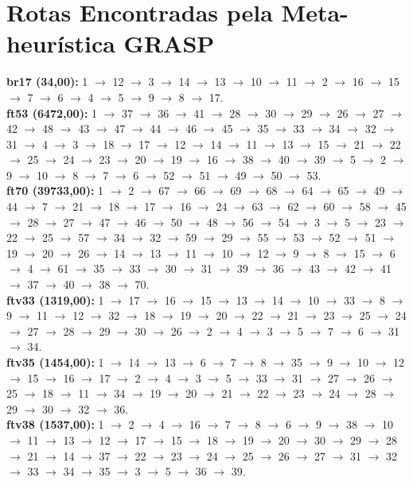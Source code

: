 \documentclass[10pt,a4paper]{article}
\begin{document}
\section{Rotas Encontradas pela Meta-heurística GRASP}
\small
\noindent \textbf{br17 (34,00):} 1 $\to$ 12 $\to$ 3 $\to$ 14 $\to$ 13 $\to$ 10 $\to$ 11 $\to$ 2 $\to$ 16 $\to$ 15 $\to$ 7 $\to$ 6 $\to$ 4 $\to$ 5 $\to$ 9 $\to$ 8 $\to$ 17. \\
\textbf{ft53 (6472,00):} 1 $\to$ 37 $\to$ 36 $\to$ 41 $\to$ 28 $\to$ 30 $\to$ 29 $\to$ 26 $\to$ 27 $\to$ 42 $\to$ 48 $\to$ 43 $\to$ 47 $\to$ 44 $\to$ 46 $\to$ 45 $\to$ 35 $\to$ 33 $\to$ 34 $\to$ 32 $\to$ 31 $\to$ 4 $\to$ 3 $\to$ 18 $\to$ 17 $\to$ 12 $\to$ 14 $\to$ 11 $\to$ 13 $\to$ 15 $\to$ 21 $\to$ 22 $\to$ 25 $\to$ 24 $\to$ 23 $\to$ 20 $\to$ 19 $\to$ 16 $\to$ 38 $\to$ 40 $\to$ 39 $\to$ 5 $\to$ 2 $\to$ 9 $\to$ 10 $\to$ 8 $\to$ 7 $\to$ 6 $\to$ 52 $\to$ 51 $\to$ 49 $\to$ 50 $\to$ 53. \\
\textbf{ft70 (39733,00):} 1 $\to$ 2 $\to$ 67 $\to$ 66 $\to$ 69 $\to$ 68 $\to$ 64 $\to$ 65 $\to$ 49 $\to$ 44 $\to$ 7 $\to$ 21 $\to$ 18 $\to$ 17 $\to$ 16 $\to$ 24 $\to$ 63 $\to$ 62 $\to$ 60 $\to$ 58 $\to$ 45 $\to$ 28 $\to$ 27 $\to$ 47 $\to$ 46 $\to$ 50 $\to$ 48 $\to$ 56 $\to$ 54 $\to$ 3 $\to$ 5 $\to$ 23 $\to$ 22 $\to$ 25 $\to$ 57 $\to$ 34 $\to$ 32 $\to$ 59 $\to$ 29 $\to$ 55 $\to$ 53 $\to$ 52 $\to$ 51 $\to$ 19 $\to$ 20 $\to$ 26 $\to$ 14 $\to$ 13 $\to$ 11 $\to$ 10 $\to$ 12 $\to$ 9 $\to$ 8 $\to$ 15 $\to$ 6 $\to$ 4 $\to$ 61 $\to$ 35 $\to$ 33 $\to$ 30 $\to$ 31 $\to$ 39 $\to$ 36 $\to$ 43 $\to$ 42 $\to$ 41 $\to$ 37 $\to$ 40 $\to$ 38 $\to$ 70. \\
\textbf{ftv33 (1319,00):} 1 $\to$ 17 $\to$ 16 $\to$ 15 $\to$ 13 $\to$ 14 $\to$ 10 $\to$ 33 $\to$ 8 $\to$ 9 $\to$ 11 $\to$ 12 $\to$ 32 $\to$ 18 $\to$ 19 $\to$ 20 $\to$ 22 $\to$ 21 $\to$ 23 $\to$ 25 $\to$ 24 $\to$ 27 $\to$ 28 $\to$ 29 $\to$ 30 $\to$ 26 $\to$ 2 $\to$ 4 $\to$ 3 $\to$ 5 $\to$ 7 $\to$ 6 $\to$ 31 $\to$ 34. \\
\textbf{ftv35 (1454,00):} 1 $\to$ 14 $\to$ 13 $\to$ 6 $\to$ 7 $\to$ 8 $\to$ 35 $\to$ 9 $\to$ 10 $\to$ 12 $\to$ 15 $\to$ 16 $\to$ 17 $\to$ 2 $\to$ 4 $\to$ 3 $\to$ 5 $\to$ 33 $\to$ 31 $\to$ 27 $\to$ 26 $\to$ 25 $\to$ 18 $\to$ 11 $\to$ 34 $\to$ 19 $\to$ 20 $\to$ 21 $\to$ 22 $\to$ 23 $\to$ 24 $\to$ 28 $\to$ 29 $\to$ 30 $\to$ 32 $\to$ 36. \\
\textbf{ftv38 (1537,00):} 1 $\to$ 2 $\to$ 4 $\to$ 16 $\to$ 7 $\to$ 8 $\to$ 6 $\to$ 9 $\to$ 38 $\to$ 10 $\to$ 11 $\to$ 13 $\to$ 12 $\to$ 17 $\to$ 15 $\to$ 18 $\to$ 19 $\to$ 20 $\to$ 30 $\to$ 29 $\to$ 28 $\to$ 21 $\to$ 14 $\to$ 37 $\to$ 22 $\to$ 23 $\to$ 24 $\to$ 25 $\to$ 26 $\to$ 27 $\to$ 31 $\to$ 32 $\to$ 33 $\to$ 34 $\to$ 35 $\to$ 3 $\to$ 5 $\to$ 36 $\to$ 39. \\
\end{document}
